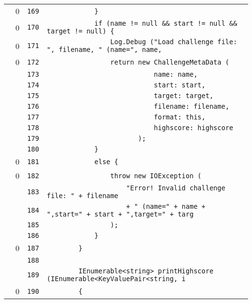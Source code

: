 \documentclass[a4paper,10pt]{article}
\begin{document}
\begin{longtable}[l]{lrrl}
\cellcolor{red} & 0 & \verb~169~ & \verb~            }~\\
\cellcolor{red} & 0 & \verb~170~ & \verb~            if (name != null && start != null && target != null) {~\\
\cellcolor{red} & 0 & \verb~171~ & \verb~                Log.Debug ("Load challenge file: ", filename, " (name=", name,~\\
\cellcolor{red} & 0 & \verb~172~ & \verb~                return new ChallengeMetaData (~\\
\cellcolor{gray} &  & \verb~173~ & \verb~                           name: name,~\\
\cellcolor{gray} &  & \verb~174~ & \verb~                           start: start,~\\
\cellcolor{gray} &  & \verb~175~ & \verb~                           target: target,~\\
\cellcolor{gray} &  & \verb~176~ & \verb~                           filename: filename,~\\
\cellcolor{gray} &  & \verb~177~ & \verb~                           format: this,~\\
\cellcolor{gray} &  & \verb~178~ & \verb~                           highscore: highscore~\\
\cellcolor{gray} &  & \verb~179~ & \verb~                       );~\\
\cellcolor{gray} &  & \verb~180~ & \verb~            }~\\
\cellcolor{red} & 0 & \verb~181~ & \verb~            else {~\\
\cellcolor{red} & 0 & \verb~182~ & \verb~                throw new IOException (~\\
\cellcolor{gray} &  & \verb~183~ & \verb~                    "Error! Invalid challenge file: " + filename~\\
\cellcolor{gray} &  & \verb~184~ & \verb~                    + " (name=" + name + ",start=" + start + ",target=" + targ~\\
\cellcolor{gray} &  & \verb~185~ & \verb~                );~\\
\cellcolor{gray} &  & \verb~186~ & \verb~            }~\\
\cellcolor{red} & 0 & \verb~187~ & \verb~        }~\\
\cellcolor{gray} &  & \verb~188~ & \verb~~\\
\cellcolor{gray} &  & \verb~189~ & \verb~        IEnumerable<string> printHighscore (IEnumerable<KeyValuePair<string, i~\\
\cellcolor{red} & 0 & \verb~190~ & \verb~        {~\\

\end{longtable}
\end{document}
